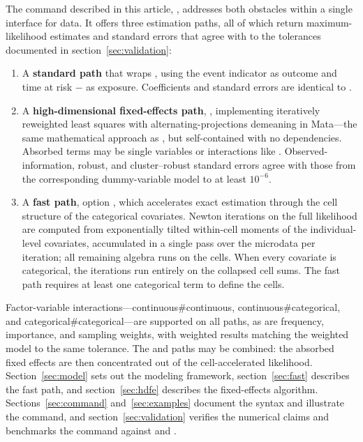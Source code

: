 \documentclass[12pt,a4paper]{article}
\begin{document}
The command described in this article, , addresses both
obstacles within a single interface for  data. It offers
three estimation paths, all of which return maximum-likelihood estimates
and standard errors that agree with  to the tolerances
documented in section~\ref{sec:validation}:

\begin{enumerate}
\item A \textbf{standard path} that wraps , using the event indicator  as outcome and time at risk  $-$  as exposure.  Coefficients and standard errors are identical to .
\item A \textbf{high-dimensional fixed-effects path}, , implementing iteratively reweighted least squares with alternating-projections demeaning in Mata---the same mathematical approach as , but self-contained with no dependencies.  Absorbed terms may be single variables or interactions like .  Observed-information, robust, and cluster--robust standard errors agree with those from the corresponding dummy-variable model to at least $10^{-6}$.
\item A \textbf{fast path}, option , which accelerates exact estimation through the cell structure of the categorical covariates.  Newton iterations on the full likelihood are computed from exponentially tilted within-cell moments of the individual-level covariates, accumulated in a single pass over the microdata per iteration; all remaining algebra runs on the cells.  When every covariate is categorical, the iterations run entirely on the collapsed cell sums.  The fast path requires at least one categorical term to define the cells.
\end{enumerate}

Factor-variable interactions---continuous\#continuous,
continuous\#categorical, and categorical\#categorical---are supported on
all paths, as are frequency, importance, and sampling weights, with
weighted results matching the weighted  model to the same
tolerance. The  and  paths may be combined:
the absorbed fixed effects are then concentrated out of the
cell-accelerated likelihood. Section~\ref{sec:model}
sets out the modeling framework, section~\ref{sec:fast}
describes the fast path, and section~\ref{sec:hdfe}
describes the fixed-effects algorithm.
Sections~\ref{sec:command}
and~\ref{sec:examples} document the syntax and
illustrate the command, and section~\ref{sec:validation}
verifies the numerical claims and benchmarks the command against
 and .
\end{document}
